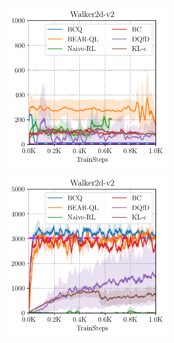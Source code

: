 \begin{figure}
\begin{subfigure}[t]{0.23\textwidth}
    \end{subfigure}%
    ~ 
    \begin{subfigure}[t]{0.23\textwidth}
        \centering
        \includegraphics[width=0.99\linewidth]{chapters/bear/images/images_camera_ready/walker_random_camera_ready.pdf}
        \includegraphics[width=0.99\linewidth]{chapters/bear/images/images_camera_ready/walker_optimal_camera_ready.pdf}

\end{subfigure}
\end{figure}
